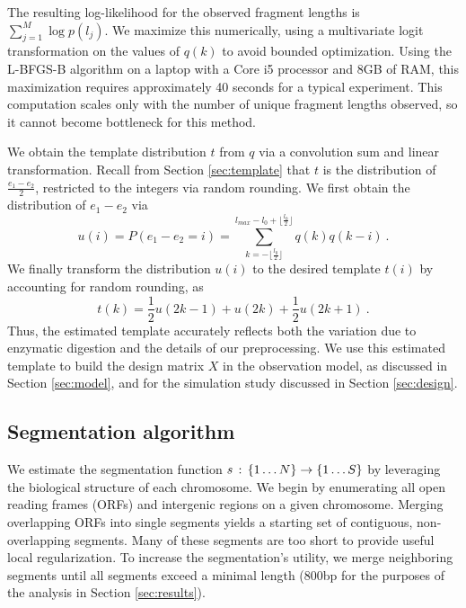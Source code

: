 The resulting log-likelihood for the observed fragment lengths is $\sum_{j = 1}^{M} \log p(l_j)$.
We maximize this numerically, using a multivariate logit transformation on the values of $q(k)$ to avoid bounded optimization.
Using the L-BFGS-B algorithm \citep{lbfgsb1997} on a laptop with a Core i5 processor and 8GB of RAM, this maximization requires approximately 40 seconds for a typical experiment.
This computation scales only with the number of unique fragment lengths observed, so it cannot become bottleneck for this method.

We obtain the template distribution $t$ from $q$ via a convolution sum and  linear transformation.
Recall from Section \ref{sec:template} that $t$ is the distribution of $\frac{e_1-e_2}{2}$, restricted to the integers via random rounding.
We first obtain the distribution of $e_1-e_2$ via
\begin{equation}
 u(i) = P(e_1-e_2=i) = \sum_{k=-\lfloor \frac{l_0}{2} \rfloor}^{
 l_{max} - l_0 + \lfloor \frac{l_0}{2} \rfloor}
 q(k) q(k-i) \ .
\end{equation}
We finally transform the distribution $u(i)$ to the desired template $t(i)$ by accounting for random rounding, as
\begin{equation}
 t(k) = \frac{1}{2}u(2k-1) + u(2k) + \frac{1}{2}u(2k+1) \ .
\end{equation}
Thus, the estimated template accurately reflects both the variation due to enzymatic digestion and the details of our preprocessing.
We use this estimated template to build the design matrix $X$ in the observation model, as discussed in Section \ref{sec:model}, and for the simulation study discussed in Section \ref{sec:design}.

\subsection{Segmentation algorithm}
\label{sec:segmentationAlgorithm}

We estimate the segmentation function $s \,:\, \left\{1 \ldots N\right\} \rightarrow \left\{1 \ldots S\right\}$ by leveraging the biological structure of each chromosome.
We begin by enumerating all open reading frames (ORFs) and intergenic regions on a given chromosome.
Merging overlapping ORFs into single segments yields a starting set of contiguous, non-overlapping segments.
Many of these segments are too short to provide useful local regularization.
To increase the segmentation's utility, we merge neighboring segments until all segments exceed a minimal length (800bp for the purposes of the analysis in Section \ref{sec:results}).

